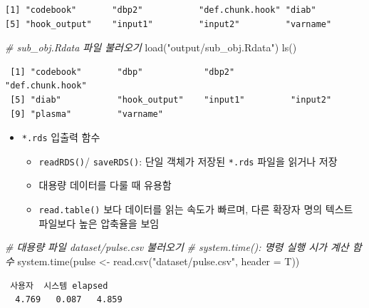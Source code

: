\documentclass[
  11pt,
]{krantz}
\newenvironment{Shaded}{\begin{snugshade}}{\end{snugshade}}
\newcommand{\AttributeTok}[1]{\textcolor[rgb]{0.61,0.61,0.61}{#1}}
\newcommand{\CommentTok}[1]{\textcolor[rgb]{0.37,0.37,0.37}{\textit{#1}}}
\newcommand{\FunctionTok}[1]{\textcolor[rgb]{0,0,0}{#1}}
\newcommand{\NormalTok}[1]{#1}
\newcommand{\OtherTok}[1]{\textcolor[rgb]{0.37,0.37,0.37}{#1}}
\newcommand{\StringTok}[1]{\textcolor[rgb]{0.5,0.5,0.5}{#1}}
\providecommand{\tightlist}{%
  \setlength{\itemsep}{0pt}\setlength{\parskip}{0pt}}
\begin{document}
\begin{verbatim}
[1] "codebook"       "dbp2"           "def.chunk.hook" "diab"          
[5] "hook_output"    "input1"         "input2"         "varname"       
\end{verbatim}

\begin{Shaded}
\begin{Highlighting}[]
\CommentTok{\# sub\_obj.Rdata 파일 불러오기}
\FunctionTok{load}\NormalTok{(}\StringTok{"output/sub\_obj.Rdata"}\NormalTok{)}
\FunctionTok{ls}\NormalTok{()}
\end{Highlighting}
\end{Shaded}

\begin{verbatim}
 [1] "codebook"       "dbp"            "dbp2"           "def.chunk.hook"
 [5] "diab"           "hook_output"    "input1"         "input2"        
 [9] "plasma"         "varname"       
\end{verbatim}

\normalsize

\begin{itemize}
\tightlist
\item
  \texttt{*.rds} 입출력 함수

  \begin{itemize}
  \tightlist
  \item
    \texttt{readRDS()}/ \texttt{saveRDS()}: 단일 객체가 저장된 \texttt{*.rds} 파일을 읽거나 저장
  \item
    대용량 데이터를 다룰 때 유용함
  \item
    \texttt{read.table()} 보다 데이터를 읽는 속도가 빠르며, 다른 확장자 명의 텍스트 파일보다 높은 압축율을 보임
  \end{itemize}
\end{itemize}

\footnotesize

\begin{Shaded}
\begin{Highlighting}[]
\CommentTok{\# 대용량 파일 dataset/pulse.csv 불러오기}
\CommentTok{\# system.time(): 명령 실행 시가 계산 함수}
\FunctionTok{system.time}\NormalTok{(pulse }\OtherTok{\textless{}{-}} \FunctionTok{read.csv}\NormalTok{(}\StringTok{"dataset/pulse.csv"}\NormalTok{, }\AttributeTok{header =}\NormalTok{ T))}
\end{Highlighting}
\end{Shaded}

\begin{verbatim}
 사용자  시스템 elapsed 
  4.769   0.087   4.859 
\end{verbatim}
\end{document}
